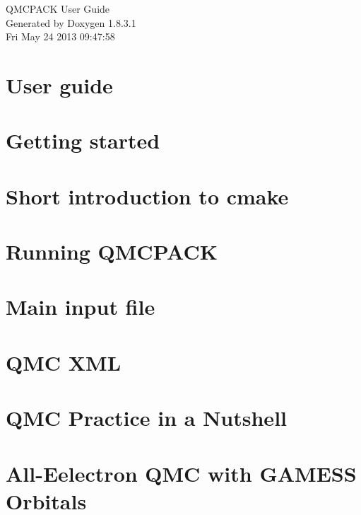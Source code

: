 \documentclass{book}
\begin{document}
\hypersetup{pageanchor=false,citecolor=blue}
\begin{titlepage}
\vspace*{7cm}
\begin{center}
{\Large QMCPACK User Guide}\\
\vspace*{1cm}
{\large Generated by Doxygen 1.8.3.1}\\
\vspace*{0.5cm}
{\small Fri May 24 2013 09:47:58}\\
\end{center}
\end{titlepage}
\clearemptydoublepage
{}
\tableofcontents
\clearemptydoublepage
{}
\hypersetup{pageanchor=true,citecolor=blue}
\chapter{User guide}
\label{index}
\chapter{Getting started}
\label{a00002}

\chapter{Short introduction to cmake}
\label{a00004}

\chapter{Running Q\+M\+C\+P\+A\+C\+K}
\label{a00006}

\chapter{Main input file}
\label{a00008}

\chapter{Q\+M\+C X\+M\+L}
\label{a00010}

\chapter{Q\+M\+C Practice in a Nutshell}
\label{a00012}

\chapter{All-\/\+Eelectron Q\+M\+C with G\+A\+M\+E\+S\+S Orbitals}
\label{a00014}

\printindex
\end{document}
